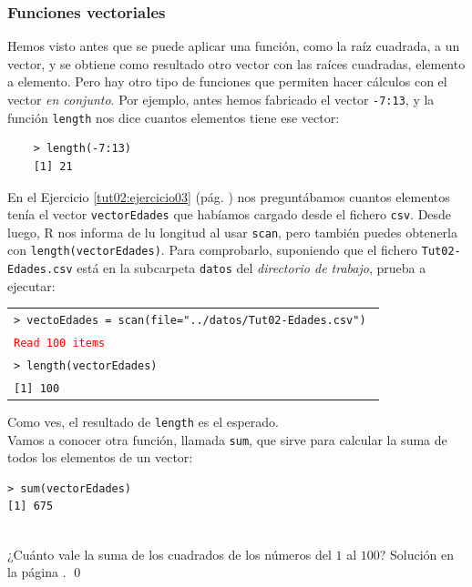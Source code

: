 \documentclass[10pt,a4paper]{article}\usepackage[]{graphicx}\usepackage[]{color}
\begin{document}
\subsubsection*{Funciones vectoriales}

Hemos visto antes que se puede aplicar una función, como la raíz cuadrada, a un vector, y se obtiene como resultado otro vector con las raíces cuadradas, elemento a elemento. Pero hay otro tipo de funciones que permiten hacer cálculos con el vector {\em en conjunto}. Por ejemplo, antes hemos fabricado el vector {\tt -7:13}, y la función {\tt length} nos dice cuantos elementos tiene ese vector:
    \begin{verbatim}
    > length(-7:13)
    [1] 21
    \end{verbatim}
En el Ejercicio \ref{tut02:ejercicio03} (pág. \pageref{tut02:ejercicio03}) nos preguntábamos cuantos elementos tenía el vector {\tt vectorEdades} que habíamos cargado desde el fichero {\tt csv}. Desde luego, R nos informa de lu longitud al usar {\tt scan}, pero también puedes obtenerla con {\tt length(vectorEdades)}. Para comprobarlo, suponiendo que el fichero {\tt Tut02-Edades.csv} está en la subcarpeta {\tt datos} del {\em directorio de trabajo}, prueba a ejecutar:
\begin{center}
\begin{tabular}{l}
{\tt > vectoEdades = scan(file="../datos/Tut02-Edades.csv") }\\
\textcolor{red}{\tt Read 100 items{}}\\
{\tt > length(vectorEdades) }\\
{\tt [1] 100 }
\end{tabular}
\end{center}
Como ves, el resultado de {\tt length} es el esperado. \\

Vamos a conocer otra función, llamada {\tt sum}, que sirve para calcular la suma de todos los elementos de un vector:
\begin{verbatim}
> sum(vectorEdades)
[1] 675
\end{verbatim}

\begin{ejercicio}
\label{tut02:ejercicio08}
\quad\\
¿Cuánto vale la suma de los cuadrados de los números del $1$ al $100$?
Solución en la página \pageref{tut02:ejercicio08:sol}. \qed
\end{ejercicio}
\end{document}

